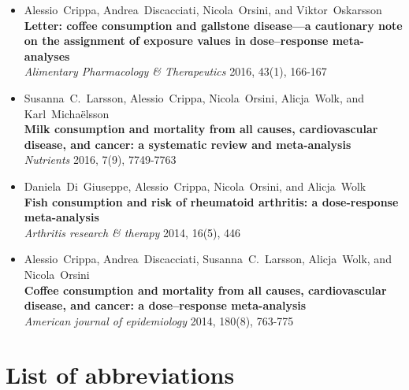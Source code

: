 \documentclass[11pt,a4paper,twoside,openany]{book}\usepackage{knitr}
\makeatletter
\def\cleardoublepage{\clearpage\if@twoside
\ifodd\c@page
\else\hbox{}\thispagestyle{empty}\newpage
\if@twocolumn\hbox{}\newpage\fi\fi\fi}
\makeatother
\begin{document}
{\begin{itemize}
\item Alessio~Crippa, Andrea~Discacciati, Nicola~Orsini, and Viktor~Oskarsson \\ \textbf{Letter: coffee consumption and gallstone disease---a cautionary note on the assignment of exposure values in dose--response meta-analyses} \\ \textit{Alimentary Pharmacology \& Therapeutics} 2016, 43(1), 166-167
\item Susanna~C.~Larsson, Alessio~Crippa, Nicola~Orsini, Alicja~Wolk, and Karl~Micha{\"e}lsson \\ \textbf{Milk consumption and mortality from all causes, cardiovascular disease, and cancer: a systematic review and meta-analysis} \\ \textit{Nutrients} 2016, 7(9), 7749-7763
\item Daniela~Di~Giuseppe, Alessio~Crippa, Nicola~Orsini, and Alicja~Wolk \\ \textbf{Fish consumption and risk of rheumatoid arthritis: a dose-response meta-analysis} \\ \textit{Arthritis research \& therapy} 2014, 16(5), 446
\item Alessio~Crippa, Andrea~Discacciati, Susanna~C.~Larsson, Alicja~Wolk, and Nicola~Orsini \\ \textbf{Coffee consumption and mortality from all causes, cardiovascular disease, and cancer: a dose--response meta-analysis} \\ \textit{American journal of epidemiology} 2014, 180(8), 763-775
\end{itemize}
\cleardoublepage
{}
\tableofcontents
{} 

%

\chapter*{List of abbreviations}
\begin{tabular}{ll}


\end{tabular}}
\end{document}
